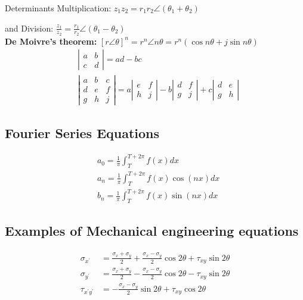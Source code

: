 \documentclass[10pt]{article}
\begin{document}
Determinants
Multiplication: $z_1 z_2=r_1 r_2 \angle\left(\theta_1+\theta_2\right)$

and Division: $\frac{z_1}{z_2}=\frac{r_1}{r_2} \angle\left(\theta_1-\theta_2\right)$\\

\textbf{De Moivre's theorem:}
$[r \angle \theta]^n=r^n \angle n \theta=r^n(\cos n \theta+j \sin n \theta)$
$$
\begin{aligned}
&\left|\begin{array}{ll}
a & b \\
c & d
\end{array}\right|=a d-b c \\
&\left|\begin{array}{lll}
a & b & c \\
d & e & f \\
g & h & j
\end{array}\right|=a\left|\begin{array}{ll}
e & f \\
h & j
\end{array}\right|-b\left|\begin{array}{ll}
d & f \\
g & j
\end{array}\right|+c\left|\begin{array}{ll}
d & e \\
g & h
\end{array}\right|
\end{aligned}
$$


\subsection{Fourier Series Equations}
$$
\begin{aligned}
&a_0=\frac{1}{\pi} \int_T^{T+2 \pi} f(x) d x \\
&a_n=\frac{1}{\pi} \int_T^{T+2 \pi} f(x) \cos (n x) d x \\
&b_n=\frac{1}{\pi} \int_T^{T+2 \pi} f(x) \sin (n x) d x
\end{aligned}
$$

\subsection{Examples of Mechanical engineering equations}

$$
\begin{aligned}
\sigma_{x^{\prime}} &=\frac{\sigma_x+\sigma_y}{2}+\frac{\sigma_x-\sigma_y}{2} \cos 2 \theta+\tau_{x y} \sin 2 \theta \\
\sigma_{y^{\prime}} &=\frac{\sigma_x+\sigma_y}{2}-\frac{\sigma_x-\sigma_y}{2} \cos 2 \theta-\tau_{x y} \sin 2 \theta \\
\tau_{x^{\prime} y^{\prime}} &=-\frac{\sigma_x-\sigma_y}{2} \sin 2 \theta+\tau_{x y} \cos 2 \theta
\end{aligned}
$$
\end{document}
